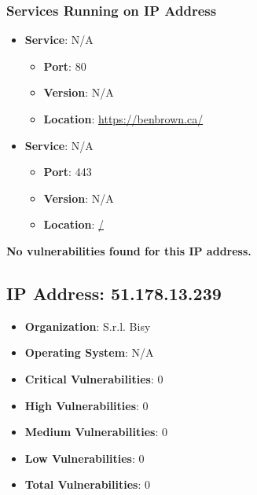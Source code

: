 \documentclass{article}
\begin{document}
\subsubsection*{Services Running on IP Address}

\begin{itemize}
    
        \item \textbf{Service}: N/A
        \begin{itemize}
            \item \textbf{Port}: 80
            \item \textbf{Version}:  N/A 
            \item \textbf{Location}: \href{ https://benbrown.ca/ }{ https://benbrown.ca/ }
        \end{itemize}
    
        \item \textbf{Service}: N/A
        \begin{itemize}
            \item \textbf{Port}: 443
            \item \textbf{Version}:  N/A 
            \item \textbf{Location}: \href{ / }{ / }
        \end{itemize}
    
\end{itemize}


\textbf{No vulnerabilities found for this IP address.}




\clearpage



\subsection{IP Address: 51.178.13.239}

\begin{itemize}
    \item \textbf{Organization}: S.r.l. Bisy
    \item \textbf{Operating System}:  N/A 
    \item \textbf{Critical Vulnerabilities}: 0
    \item \textbf{High Vulnerabilities}: 0
    \item \textbf{Medium Vulnerabilities}: 0
    \item \textbf{Low Vulnerabilities}: 0
    \item \textbf{Total Vulnerabilities}: 0
\end{itemize}
\end{document}
